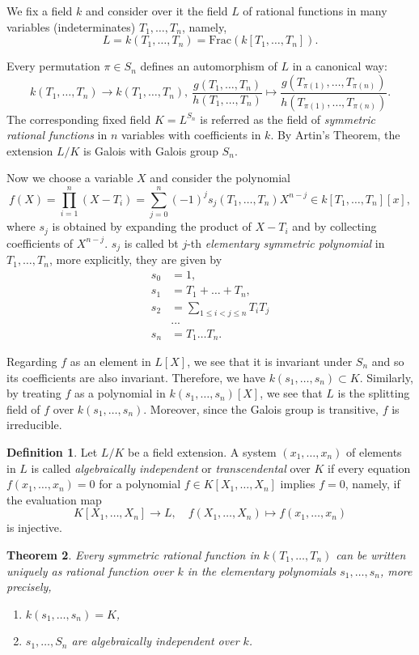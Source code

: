 \documentclass[12pt]{report}
\newtheorem{theorem}{Theorem}[section]
\theoremstyle{definition}
\newtheorem{definition}[theorem]{Definition}
\begin{document}
We fix a field $k$ and consider over it the field $L$ of rational functions in many variables (indeterminates) $T_1,\dots,T_n$, namely,
\[L=k(T_1,\dots,T_n)=\mbox{Frac}(k[T_1,\dots,T_n]).\]

Every permutation $\pi\in S_n$ defines an automorphism of $L$ in a canonical way: $$k(T_1,\dots,T_n)\to k(T_1,\dots,T_n),~\frac{g(T_1,\dots,T_n)}{h(T_1,\dots,T_n)}\mapsto \frac{g(T_{\pi(1)},\dots,T_{\pi(n)})}{h(T_{\pi(1)},\dots,T_{\pi(n)})}.$$
The corresponding fixed field $K=L^{S_n}$ is referred as the field of \emph{symmetric rational functions} in $n$ variables with coefficients in $k$. By Artin's Theorem, the extension $L/K$ is Galois with Galois group $S_n$.

Now we choose a variable $X$ and consider the polynomial
$$f(X)=\prod_{i=1}^n(X-T_i)=\sum_{j=0}^n (-1)^js_j(T_1,\dots,T_n)X^{n-j}\in k[T_1,\dots,T_n][x],$$
where $s_j$ is obtained by expanding the product of $X-T_i$ and by collecting coefficients of $X^{n-j}$. $s_j$ is called bt $j$-th \emph{elementary symmetric polynomial} in $T_1,\dots,T_n$, more explicitly, they are given by
\begin{align*}
	s_0 & =1,                             \\
	s_1 & =T_1+\dots+T_n,                 \\
	s_2 & = \sum_{1\leq i<j\leq n} T_iT_j \\
	    & ...                             \\
	s_n & =T_1\dots T_n.
\end{align*}

Regarding $f$ as an element in $L[X]$, we see that it is invariant under $S_n$ and so its coefficients are also invariant. Therefore, we have $k(s_1,\dots,s_n)\subset K$. Similarly, by treating $f$ as a polynomial in $k(s_1,\dots,s_n)[X]$, we see that $L$ is the splitting field of $f$ over $k(s_1,\dots,s_n)$. Moreover, since the Galois group is transitive, $f$ is irreducible.

\begin{definition}
	Let $L/K$ be a field extension. A system $(x_1,\dots, x_n)$ of elements in $L$ is called \emph{algebraically independent} or \emph{transcendental} over $K$ if every equation $f(x_1,\dots, x_n) = 0$ for a polynomial $f \in K[X_1,\dots, X_n]$ implies $f = 0$, namely, if the evaluation map
	$$K[X_1,\dots, X_n]\to L,\quad f(X_1,\dots,X_n)\mapsto f(x_1,\dots, x_n)$$
	is injective.
\end{definition}

\begin{theorem}
	Every symmetric rational function in $k(T_1,\dots,T_n)$ can be written uniquely as rational function over $k$ in the elementary polynomials $s_1,\dots,s_n$, more precisely,
	\begin{enumerate}
		\item $k(s_1,\dots,s_n)=K$,
		\item $s_1,\dots,S_n$ are algebraically independent over $k$.
	\end{enumerate}
\end{theorem}
\end{document}
